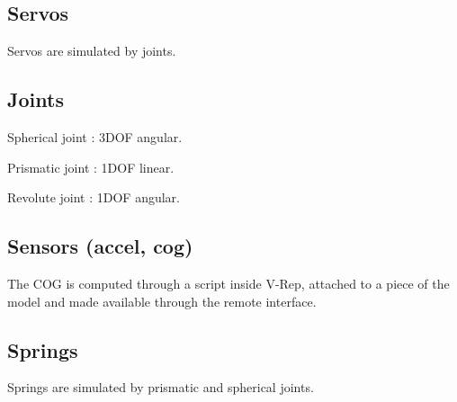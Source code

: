 \subsection{Servos}
Servos are simulated by joints.

\subsection{Joints}
Spherical joint : 3DOF angular.

Prismatic joint : 1DOF linear.

Revolute joint : 1DOF angular.

\subsection{Sensors (accel, cog)}
The COG is computed through a script inside V-Rep, attached to a piece of the model and made available through the remote interface\cite{vrep_manual}.



\subsection{Springs}
Springs are simulated by prismatic and spherical joints.